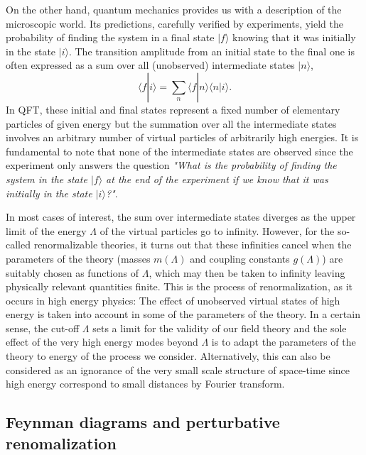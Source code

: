 \documentclass[10pt,here,feynmf]{article}
\begin{document}
On the other hand, quantum mechanics provides us with a description of the microscopic world. Its predictions, carefully verified by experiments, yield the probability of finding the system in a final state $|f\rangle$ knowing that it was initially in the state $|i\rangle$. The transition amplitude from an initial state to the final one is often expressed as a sum over all (unobserved) intermediate states $|n\rangle$,
\begin{equation}
\langle f|i\rangle=\sum_{n}\langle f|n\rangle\langle n|i\rangle.
\end{equation}
In QFT, these initial and final states represent a fixed number of elementary particles of given energy but the summation over all the intermediate states involves an arbitrary number of virtual particles of arbitrarily high energies. It is fundamental to note that none of the intermediate states are observed since the experiment only answers the question \emph{"What is the probability of finding the system in the state $|f\rangle $ at  the end of the experiment if we know that it was initially in the state $|i\rangle$?"}.  

In most cases of interest, the sum over intermediate states diverges as the upper limit of the energy $\Lambda$ of the virtual particles go to infinity. However, for the so-called renormalizable theories, it turns out that these infinities cancel  when the parameters of the theory (masses $m(\Lambda)$ and coupling constants  $g(\Lambda)$) are suitably chosen as functions of  $\Lambda$, which may then be taken to infinity leaving physically relevant quantities finite. This is the process of renormalization, as it occurs in high energy physics: The effect of unobserved virtual states of high energy is taken into account in some of the parameters of the theory. In a certain sense, the cut-off $\Lambda$ sets a limit for the validity of our field theory  and the sole effect of the very high energy modes beyond $\Lambda$ is to adapt the parameters of the theory to energy of the process we consider.  Alternatively, this can also be considered as an ignorance of the very small scale structure of space-time since high energy correspond to small distances by Fourier transform.

\subsection{Feynman diagrams and perturbative renomalization}
\end{document}
